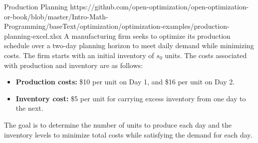 \begin{examplewithallcode}{Production Planning}
{https://github.com/open-optimization/open-optimization-or-book/blob/master/Intro-Math-Programming/baseText/optimization/optimization-examples/production-planning-excel.xlsx}{}{}
A manufacturing firm seeks to optimize its production schedule over a two-day planning horizon to meet daily demand while minimizing costs. The firm starts with an initial inventory of \( s_0 \) units. The costs associated with production and inventory are as follows:

\begin{itemize}
    \item \textbf{Production costs:} \$10 per unit on Day 1, and \$16 per unit on Day 2.
    \item \textbf{Inventory cost:} \$5 per unit for carrying excess inventory from one day to the next.
\end{itemize}


The goal is to determine the number of units to produce each day and the inventory levels to minimize total costs while satisfying the demand for each day.

\end{examplewithallcode}

